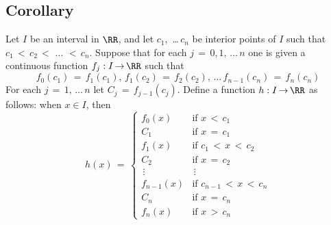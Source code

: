 {\V

            \subsection{\small{\bf Corollary}}
            \label{CorD30.05B}

    Let $I$ be an interval in ${\RR}$, and let $c_{1}$, \,{\ldots}\,$c_{n}$ be interior points of $I$
    such that $c_{1}\,<\,c_{2}\,<\,\,{\ldots}\,\,<\,c_{n}$.
    Suppose that for each $j \,=\, 0,1,\,{\ldots}\,n$ one is given a continuous function
    $f_{j}:I \,{\rightarrow}\, {\RR}$ such that
        \begin{displaymath}
        f_{0}(c_{1}) \,=\, f_{1}(c_{1}), \,f_{1}(c_{2}) \,=\, f_{2}(c_{2}),\,{\ldots}\,
        f_{n-1}(c_{n}) \,=\, f_{n}(c_{n})
        \end{displaymath}
    For each $j \,=\, 1,\,{\ldots}\,n$ let $C_{j} \,=\, f_{j-1}(c_{j})$.
Define a function $h:I \,{\rightarrow}\, {\RR}$ as follows: when $x{\in}I$, then
        \begin{displaymath}
    h(x) \,=\,
        \left\{
        \begin{array}{ll}
        f_{0}(x) & \mbox{if $x\,<\,c_{1}$}   \\
        C_{1}    & \mbox{if $x \,=\, c_{1}$} \\
        f_{1}(x) & \mbox{if $c_{1}\,<\,x\,<\,c_{2}$}   \\
        C_{2}    & \mbox{if $x \,=\, c_{2}$} \\
    \,{\vdots}\, &    \,{\vdots}\,           \\
        f_{n-1}(x) & \mbox{if $c_{n-1}\,<\,x\,<\,c_{n}$}   \\
        C_{n}    & \mbox{if $x \,=\, c_{n}$} \\
        f_{n}(x) & \mbox{if $x\,>\,c_{n}$}
        \end{array}
        \right.
        \end{displaymath}

}%

